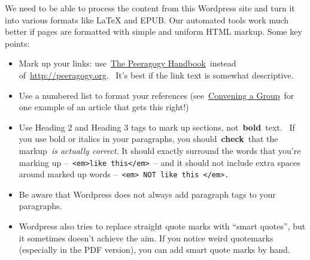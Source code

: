 We need to be able to process the content from this Wordpress site and
turn it into various formats like LaTeX and EPUB. Our automated tools
work much better if pages are formatted with simple and uniform HTML
markup. Some key points:

\begin{itemize}
\itemsep1pt\parskip0pt
\item
  Mark up your links: use~\href{http://peeragogy.org}{The Peeragogy
  Handbook}~instead
  of~\href{http://peeragogy.org}{http://peeragogy.org}.~ It's best if
  the link text is somewhat descriptive.
\item
  Use a numbered list to format your references
  (see~\href{http://peeragogy.org/convening-a-group/}{Convening a
  Group}~for one example of an article that gets this right!)
\item
  Use Heading 2 and Heading 3 tags to mark up sections,
  not~\textbf{bold}~text.~ If you use bold or italics in your
  paragraphs, you should~\textbf{check}~that the markup~\emph{is
  actually correct}. It should exactly surround the words that you're
  marking up
  --~\texttt{\textless{}em\textgreater{}like this\textless{}/em\textgreater{}}~--
  and it should not include extra spaces around marked up words
  --~\texttt{\textless{}em\textgreater{} NOT like this \textless{}/em\textgreater{}.}
\item
  Be aware that Wordpress does not always add paragraph tags to your
  paragraphs.
\item
  Wordpress also tries to replace straight quote marks with ``smart
  quotes'', but it sometimes doesn't achieve the aim. If you notice
  weird quotemarks (especially in the PDF version), you can add smart
  quote marks by hand.
\end{itemize}

~
